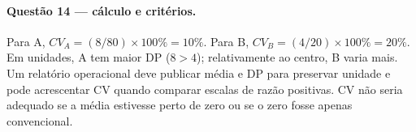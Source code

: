 \paragraph{Questão 14 — cálculo e critérios.} Para A, $CV_A=(8/80)\times100\%=10\%$. Para B, $CV_B=(4/20)\times100\%=20\%$. Em unidades, A tem maior DP ($8>4$); relativamente ao centro, B varia mais. Um relatório operacional deve publicar média e DP para preservar unidade e pode acrescentar CV quando comparar escalas de razão positivas. CV não seria adequado se a média estivesse perto de zero ou se o zero fosse apenas convencional.
